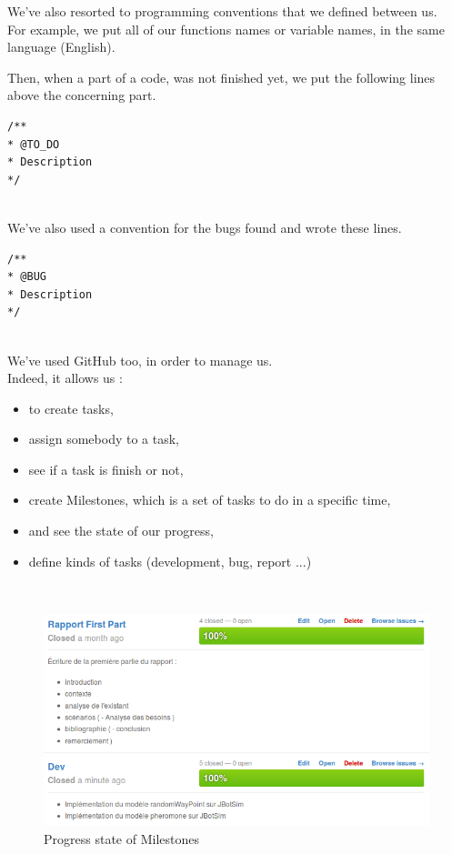 We've also resorted to programming conventions that we defined between us.\\
For example, we put all of our functions names or variable names, in the same language (English).\\

\newpage

Then, when a part of a code, was not finished yet, we put the following lines above the concerning part.

\begin{lstlisting}[frame=trBL, title=Programming convention for unfinished code]
/**
* @TO_DO
* Description
*/
\end{lstlisting}
~\\

We've also used a convention for the bugs found and wrote these lines.\\

\begin{lstlisting}[frame=trBL, title=Programming convention for bugs]
/**
* @BUG
* Description
*/
\end{lstlisting}
~\\

We've used GitHub too, in order to manage us.\\
Indeed, it allows us :\\

\begin{itemize}
\item to create tasks, 
\item assign somebody to a task, 
\item see if a task is finish or not,
\item create Milestones, which is a set of tasks to do in a specific time, 
\item and see the state of our progress,
\item define kinds of tasks (development, bug, report ...)
\end{itemize}
~\\

\begin{figure}[!h]
\caption{\label{Milestones}Progress state of Milestones}
   \includegraphics[scale=0.7]{../images/Milestones.png}
\end{figure}

